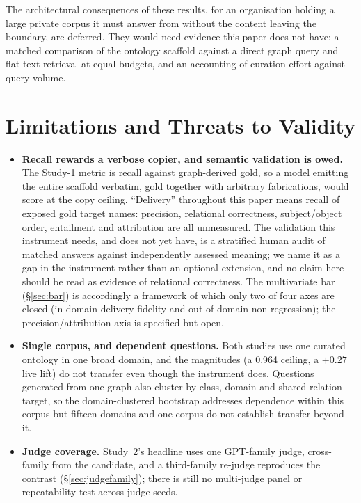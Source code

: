 \documentclass[10pt,twocolumn]{article}
\begin{document}
The architectural consequences of these results, for an organisation holding a large private corpus it must answer from without the content leaving the boundary, are deferred. They would need evidence this paper does not have: a matched comparison of the ontology scaffold against a direct graph query and flat-text retrieval at equal budgets, and an accounting of curation effort against query volume.

\section{Limitations and Threats to Validity}\label{sec:limits}
\begin{itemize}[topsep=2pt,itemsep=2pt,leftmargin=1.4em]
\item \textbf{Recall rewards a verbose copier, and semantic validation is owed.} The Study-1 metric is recall against graph-derived gold, so a model emitting the entire scaffold verbatim, gold together with arbitrary fabrications, would score at the copy ceiling. ``Delivery'' throughout this paper means recall of exposed gold target names: precision, relational correctness, subject/object order, entailment and attribution are all unmeasured. The validation this instrument needs, and does not yet have, is a stratified human audit of matched answers against independently assessed meaning; we name it as a gap in the instrument rather than an optional extension, and no claim here should be read as evidence of relational correctness. The multivariate bar (\S\ref{sec:bar}) is accordingly a framework of which only two of four axes are closed (in-domain delivery fidelity and out-of-domain non-regression); the precision/attribution axis is specified but open.
\item \textbf{Single corpus, and dependent questions.} Both studies use one curated ontology in one broad domain, and the magnitudes (a 0.964 ceiling, a $+0.27$ live lift) do not transfer even though the instrument does. Questions generated from one graph also cluster by class, domain and shared relation target, so the domain-clustered bootstrap addresses dependence within this corpus but fifteen domains and one corpus do not establish transfer beyond it.
\item \textbf{Judge coverage.} Study~2's headline uses one GPT-family judge, cross-family from the candidate, and a third-family re-judge reproduces the contrast (\S\ref{sec:judgefamily}); there is still no multi-judge panel or repeatability test across judge seeds.

\end{itemize}
\end{document}
